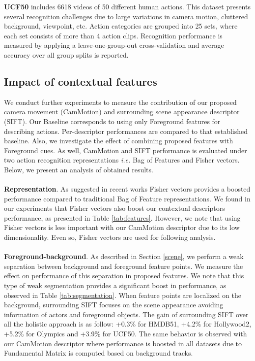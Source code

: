 \documentclass[runningheads]{llncs}
\begin{document}
\textbf{UCF50} \cite{reddy2013} includes 6618 videos of 50 different human actions.  This dataset presents several recognition challenges due to large variations in camera motion, cluttered background, viewpoint, etc. Action categories are grouped into 25 sets, where each set consists of more than 4 action clips. Recognition performance is measured by applying a leave-one-group-out cross-validation and average accuracy over all group splits is reported.

\subsection{Impact of contextual features}
We conduct further experiments to measure the  contribution of our proposed camera movement (CamMotion) and surrounding scene appearance descriptor (SIFT). Our Baseline corresponds to using only Foreground features for describing actions. Per-descriptor performances are compared to that established baseline. Also, we investigate the effect of combining proposed features with Foreground cues. As well, CamMotion and SIFT performance is evaluated under two action recognition representations \emph{i.e.} Bag of Features and Fisher vectors. Below, we present an analysis of obtained results.\\\\
\textbf{Representation}. As suggested in recent works \cite{perronnin2010, wang2013, xwang2013} Fisher vectors provides a boosted performance compared to traditional Bag of Feature representations. We found in our experiments that Fisher vectors also boost our contextual descriptors performance, as presented in Table \ref{tab:features}. However, we note that using Fisher vectors is less important with our CamMotion descriptor due to its low dimensionality. Even so, Fisher vectors are used for following analysis.\\\\
\textbf{Foreground-background}. As described in Section \ref{scene}, we perform a weak separation between background and foreground feature points. We measure the effect on performance of this separation in proposed features. We note that this type of weak segmentation provides a significant boost in performance, as observed in Table \ref{tab:segmentation}. When feature points are localized on the background, surrounding SIFT focuses on the scene appearance avoiding information of actors and foreground objects. The gain of surrounding SIFT over all the holistic approach is as follow: +0.3\% for HMDB51, +4.2\% for Hollywood2, +5.2\% for Olympics and +3.9\% for UCF50. The same behavior is observed with our CamMotion descriptor where performance is boosted in all datasets due to Fundamental Matrix is computed based on background tracks.\\\\
\end{document}
